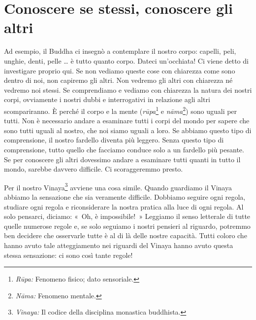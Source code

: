\section{Conoscere se stessi, conoscere gli altri}

Ad esempio, il Buddha ci insegnò a contemplare il nostro corpo: capelli,
peli, unghie, denti, pelle \ldots{} è tutto quanto corpo. Dateci
un'occhiata! Ci viene detto di investigare proprio qui. Se non vediamo
queste cose con chiarezza come sono dentro di noi, non capiremo gli
altri. Non vedremo gli altri con chiarezza né vedremo noi stessi. Se
comprendiamo e vediamo con chiarezza la natura dei nostri corpi,
ovviamente i nostri dubbi e interrogativi in \mbox{relazione} agli altri
scompariranno. È perché il corpo e la mente (\emph{rūpa}\footnote{\emph{Rūpa:}
  Fenomeno fisico; dato sensoriale.} e \emph{nāma}\footnote{\emph{Nāma:}
  Fenomeno mentale.}) sono uguali per tutti. Non è necessario andare a
esaminare tutti i corpi del mondo per sapere che sono tutti uguali al
nostro, che noi siamo uguali a loro. Se abbiamo questo tipo di
comprensione, il nostro fardello diventa più leggero. Senza questo tipo
di comprensione, tutto quello che facciamo conduce solo a un fardello
più pesante. Se per conoscere gli altri dovessimo andare a esaminare
tutti quanti in tutto il mondo, sarebbe davvero difficile. Ci
scoraggeremmo presto.

Per il nostro Vinaya\footnote{\emph{Vinaya:} Il codice della disciplina
  monastica buddhista.} avviene una cosa simile. Quando guardiamo il
Vinaya abbiamo la sensazione che sia veramente difficile. Dobbiamo
seguire ogni regola, studiare ogni regola e riconsiderare la nostra
pratica alla luce di ogni regola. Al solo pensarci, diciamo: «~Oh, è
impossibile!~» Leggiamo il senso letterale di tutte quelle numerose
regole e, se solo seguiamo i nostri pensieri al riguardo, potremmo ben
decidere che osservarle tutte è al di là delle nostre capacità. Tutti
coloro che hanno avuto tale atteggiamento nei riguardi del Vinaya hanno
avuto questa stessa sensazione: ci sono così tante regole!

